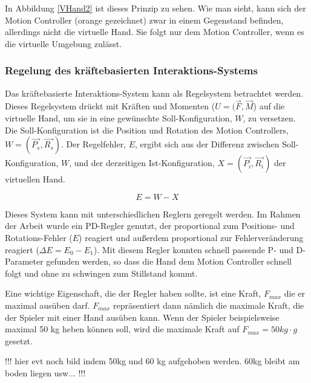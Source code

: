 In Abbildung \ref{VHand2} ist dieses Prinzip zu sehen. Wie man sieht, kann sich der Motion Controller (orange gezeichnet) zwar in einem Gegenstand befinden, allerdings nicht die virtuelle Hand. Sie folgt nur dem Motion Controller, wenn es die virtuelle Umgebung zulässt.


\subsubsection{Regelung des kräftebasierten Interaktions-Systems}
Das kräftebasierte Interaktions-System kann als Regelsystem betrachtet werden. Dieses Regelsystem drückt mit Kräften und Momenten ($U = (\vec{F} , \vec{M}$) auf die virtuelle Hand, um sie in eine gewünschte Soll-Konfiguration, $W$, zu versetzen. Die Soll-Konfiguration ist die Position und Rotation des Motion Controllers, $W = (\vec{P_s} , \vec{R_s})$. Der Regelfehler, $E$, ergibt sich aus der Differenz zwischen Soll-Konfiguration, $W$, und der derzeitigen Ist-Konfiguration, $X = (\vec{P_i} , \vec{R_i})$ der virtuellen Hand.

\begin{equation}
E = W - X
\label{form_error}
\end{equation}

Dieses System kann mit unterschiedlichen Reglern geregelt werden. Im Rahmen der Arbeit wurde ein PD-Regler genutzt, der proportional zum Positions- und Rotations-Fehler ($E$) reagiert und außerdem proportional zur Fehlerveränderung reagiert ($\Delta E = E_0 - E_1$). Mit diesem Regler konnten schnell passende P- und D-Parameter gefunden werden, so dass die Hand dem Motion Controller schnell folgt und ohne zu schwingen zum Stillstand kommt.

Eine wichtige Eigenschaft, die der Regler haben sollte, ist eine Kraft, $F_{max}$ die er maximal ausüben darf. $F_{max}$ repräsentiert dann nämlich die maximale Kraft, die der Spieler mit einer Hand ausüben kann. Wenn der Spieler beispielsweise maximal 50 kg heben können soll, wird die maximale Kraft auf $F_{max} = 50kg \cdot g$ gesetzt.

!!! hier evt noch bild indem 50kg und 60 kg aufgehoben werden. 60kg bleibt am boden liegen usw... !!!

